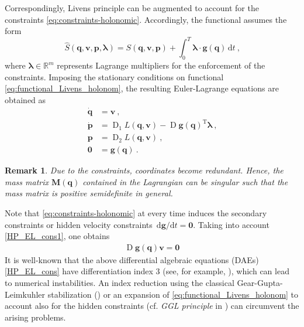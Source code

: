\documentclass{multibody2023_full_paper}
\newtheorem{remark}[theorem]{Remark}
\newcommand{\dt}{\mathrm{d}t}
\renewcommand{\d}[1][]{\ensuremath{\,\mathrm{d}#1}}
\DeclareMathOperator{\D}{D}
\newcommand{\transp}{^\mathrm{T}}
\renewcommand{\vec}[1]{\ensuremath{\mbox{$\mathbf{#1}$}}}
\newcommand{\eqcomma}{\ensuremath{\ \text{,}}}
\newcommand{\eqdot}{\ensuremath{\ \text{.}}}
\begin{document}
Correspondingly, Livens principle can be augmented to account for the constraints \eqref{eq:constraints-holonomic}. Accordingly, the functional assumes the form
\begin{equation} \label{eq:functional_Livens_holonom}
    \hat{S}(\vec{q},\vec{v},\vec{p},{\bm \lambda}) = {S}(\vec{q},\vec{v},\vec{p}) + \int\nolimits_0^T {\bm \lambda}\cdot\vec{g}(\vec{q})\, \dt \eqcomma
\end{equation}
where ${\bm \lambda}\in\mathbb{R}^m$ represents Lagrange multipliers for the enforcement of the constraints.
Imposing the stationary conditions on functional \eqref{eq:functional_Livens_holonom}, the resulting Euler-Lagrange equations are obtained as
\begin{subequations}
    \label{HP_EL_cons}
    \begin{align}
        \dot{\vec{q}} & = \vec{v} \eqcomma \label{HP_EL_cons1}                                                           \\
        \dot{\vec{p}} & = \D_1 L(\vec{q},\vec{v}) - \D \vec{g}(\vec{q})\transp {\bm \lambda}\eqcomma \label{HP_EL_cons2} \\
        \vec{p}       & = \D_2 L(\vec{q},\vec{v}) \label{HP_EL_cons3} \eqcomma                                           \\
        \vec{0}       & = \vec{g}(\vec{q})  \eqdot \label{HP_EL_cons4}
    \end{align}
\end{subequations}

\begin{remark}
    Due to the constraints, coordinates become redundant. Hence, the mass matrix $\vec{M}(\vec{q})$ contained in the Lagrangian can be singular such that the mass matrix is positive semidefinite in general.
\end{remark}
Note that \eqref{eq:constraints-holonomic} at every time induces the secondary constraints or hidden velocity constraints $\d \vec{g} / \dt = \vec{0}$. Taking into account \eqref{HP_EL_cons1}, one obtains
\begin{align}
    \D\vec{g}(\vec{q})\vec{v} = \vec{0} \label{secondary_constraints}
\end{align}
It is well-known that the above differential algebraic equations (DAEs) \eqref{HP_EL_cons} have differentiation index 3 (see, for example, \cite{kunkel_differential-algebraic_2006}), which can lead to numerical instabilities. An index reduction using the classical Gear-Gupta-Leimkuhler stabilization (\cite{gear_automatic_1985}) or an expansion of \eqref{eq:functional_Livens_holonom} to account also for the hidden constraints (cf. \textit{GGL principle} in \cite{kinon_ggl_2023, kinon_structure_2023}) can circumvent the arising problems.
\end{document}
